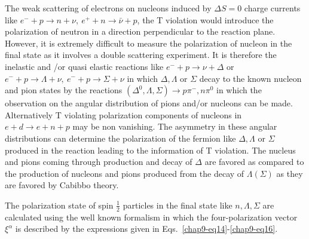     The weak scattering of electrons on nucleons induced by $\Delta S=0$ charge currents like $e^-+p\rightarrow n+\nu,~ e^++n\rightarrow \bar{\nu}+p$, the T violation would introduce the polarization of neutron in a direction perpendicular to the reaction plane. However, it is extremely difficult to measure the polarization of nucleon in the final state as  it involves a double scattering experiment. It is therefore the inelastic and /or quasi elastic reactions like $e^-+p\rightarrow \nu+\Delta$ or $ e^-+p\rightarrow \Lambda
    +\nu,~ e^-+p\rightarrow \Sigma+\nu$ in which $\Delta, \Lambda$ or $ \Sigma$ decay to the known nucleon and pion states by the reactions $(\Delta^0,\Lambda,\Sigma)\rightarrow p\pi^-,n\pi^0$ in which the observation on the angular distribution of pions and/or nucleons can be made. Alternatively T violating polarization components of nucleons in $e+d\rightarrow e+n+p$ may be non vanishing. The asymmetry in these angular distributions can determine the polarization of the fermion like $\Delta,\Lambda$ or $\Sigma$ produced in the reaction leading to the information of T violation. The nucleus and pions coming through production and decay  of $\Delta$ are favored as compared to the production of nucleons and pions produced from the decay of $\Lambda(\Sigma)$ as they are favored by Cabibbo theory.
    
   The polarization state of spin $\frac{1}{2}$ particles in the final state like $n,\Lambda,\Sigma$ are calculated using the well known formalism in which the four-polarization vector $\xi^\alpha$ is described by the expressions given in Eqs.~\ref{chap9-eq14}-\ref{chap9-eq16}.
   

